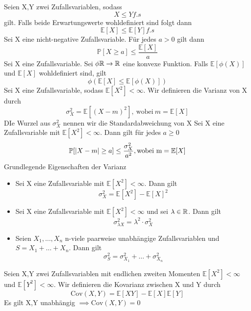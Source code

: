\Satz[4.19] \newline
Seien X,Y zwei Zufallsvariablen, sodass \[ X \leq Y f.s\] gilt. Falls beide Erwartungswerte wohldefiniert sind folgt dann \[ \mathbb{E}[X] \leq \mathbb{E}[Y] f.s\]
 \newline
Sei X eine nicht-negative Zufallsvariable. Für jedes \( a > 0\) gilt dann \[ \mathbb{P}[X \geq a ] \leq \frac{\mathbb{E}[X]}{a}\]
 \newline
Sei X eine Zufallsvariable. Sei \( \phi \mathbb{R} \rightarrow \mathbb{R} \) eine konvexe Funktion. Falls \( \mathbb{E}[\phi(X)]\) und \( \mathbb{E}[X]\) wohldefiniert sind, gilt \[ \phi(\mathbb{E}[X] \leq \mathbb{E}[\phi(X)])\]
\Def[4.22] Sei X eine Zufallsvariable, sodass \( \mathbb{E}[X^2] < \infty \). Wir definieren die Varianz von X durch \[ \sigma_X^2 = \mathbb{E}[(X-m)^2], \ \text{wobei} \ m=\mathbb{E}[X]\] DIe Wurzel aus \(\sigma_X^2\) nennen wir die Standardabweichung von X \newline
{} \newline
Sei X eine Zufallsvariable mit \( \mathbb{E}[X^2] < \infty\). Dann gilt für jedes \( a \geq 0\) \[ \mathbb{P}[\left\lvert X -m \right\rvert \geq a] \leq \frac{\sigma_X^2}{a^2}, \text{wobei m} = \mathbb{E}[X]\]
\Satz[4.25] Grundlegende Eigenschaften der Varianz \newline
\begin{itemize}
    \item Sei X eine Zufallsvariable mit \( \mathbb{E}[X^2] < \infty \). Dann gilt \[ \sigma_X^2 = \mathbb{E}[X^2] - \mathbb{E}[X]^2\]
    \item Sei X eine Zufallsvariable mit \( \mathbb{E}[X^2] < \infty \) und sei \( \lambda \in \mathbb{R} \). Dann gilt \[ \sigma_{\lambda X}^2 = \lambda^2 \cdot \sigma_X^2\]
    \item Seien \(X_1, \dots , X_n \) n-viele paarweise unabhängige Zufallsvariablen und \(S = X_1 + \dots + X_n\). Dann gilt \[ \sigma_S^2 = \sigma_{X_1}^2 + \dots + \sigma_{X_n}^2\]
\end{itemize}
\Def[4.26] \newline
Seien X,Y zwei Zufallsvariablen mit endlichen zweiten Momenten \( \mathbb{E}[X^2] < \infty \) und \( \mathbb{E}[Y^2] < \infty \). Wir definieren die Kovarianz zwischen X und Y durch \[\text{Cov}(X,Y) = \mathbb{E}[XY]-\mathbb{E}[X]\mathbb{E}[Y]\]
\Bem[4.26A] \newline
Es gilt X,Y unabhängig \( \implies \text{Cov}(X,Y) = 0\)
